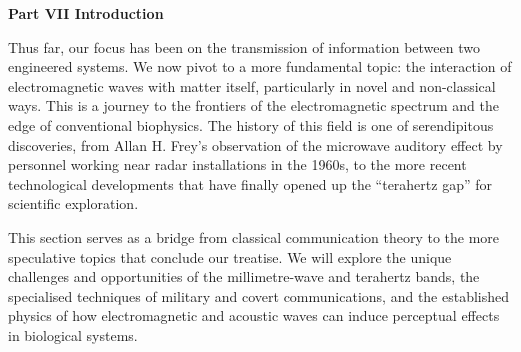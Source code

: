 \newpage
\thispagestyle{empty}

\vspace*{3cm}

\begin{center}
{\Large\lorettadisplay\bfseries Part VII Introduction}
\end{center}

\vspace{2cm}

Thus far, our focus has been on the transmission of information between two engineered systems. We now pivot to a more fundamental topic: the interaction of electromagnetic waves with matter itself, particularly in novel and non-classical ways. This is a journey to the frontiers of the electromagnetic spectrum and the edge of conventional biophysics. The history of this field is one of serendipitous discoveries, from Allan H. Frey's observation of the microwave auditory effect by personnel working near radar installations in the 1960s, to the more recent technological developments that have finally opened up the ``terahertz gap'' for scientific exploration.

\vspace{1em}

This section serves as a bridge from classical communication theory to the more speculative topics that conclude our treatise. We will explore the unique challenges and opportunities of the millimetre-wave and terahertz bands, the specialised techniques of military and covert communications, and the established physics of how electromagnetic and acoustic waves can induce perceptual effects in biological systems.

\vspace*{\fill}
\newpage
